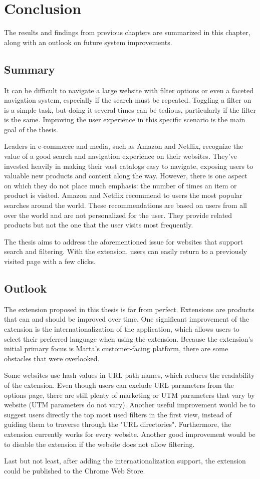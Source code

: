 \newpage
\chapter{Conclusion}
The results and findings from previous chapters are summarized in this chapter, along with an outlook on future system improvements.

\section{Summary}
It can be difficult to navigate a large website with filter options or even a faceted navigation system, especially if the search must be repeated. Toggling a filter on is a simple task, but doing it several times can be tedious, particularly if the filter is the same. Improving the user experience in this specific scenario is the main goal of the thesis.

Leaders in e-commerce and media, such as Amazon and Netflix, recognize the value of a good search and navigation experience on their websites. They've invested heavily in making their vast catalogs easy to navigate, exposing users to valuable new products and content along the way. However, there is one aspect on which they do not place much emphasis: the number of times an item or product is visited. Amazon and Netflix recommend to users the most popular searches around the world. These recommendations are based on users from all over the world and are not personalized for the user. They provide related products but not the one that the user visits most frequently.

The thesis aims to address the aforementioned issue for websites that support search and filtering. With the extension, users can easily return to a previously visited page with a few clicks.

\section{Outlook}
The extension proposed in this thesis is far from perfect. Extensions are products that can and should be improved over time. One significant improvement of the extension is the internationalization of the application, which allows users to select their preferred language when using the extension. Because the extension's initial primary focus is Marta's customer-facing platform, there are some obstacles that were overlooked.

Some websites use hash values in URL path names, which reduces the readability of the extension. Even though users can exclude URL parameters from the options page, there are still plenty of marketing or UTM parameters that vary by website (UTM parameters do not vary). Another useful improvement would be to suggest users directly the top most used filters in the first view, instead of guiding them to traverse through the "URL directories". Furthermore, the extension currently works for every website. Another good improvement would be to disable the extension if the website does not allow filtering.

Last but not least, after adding the internationalization support, the extension could be published to the Chrome Web Store.
